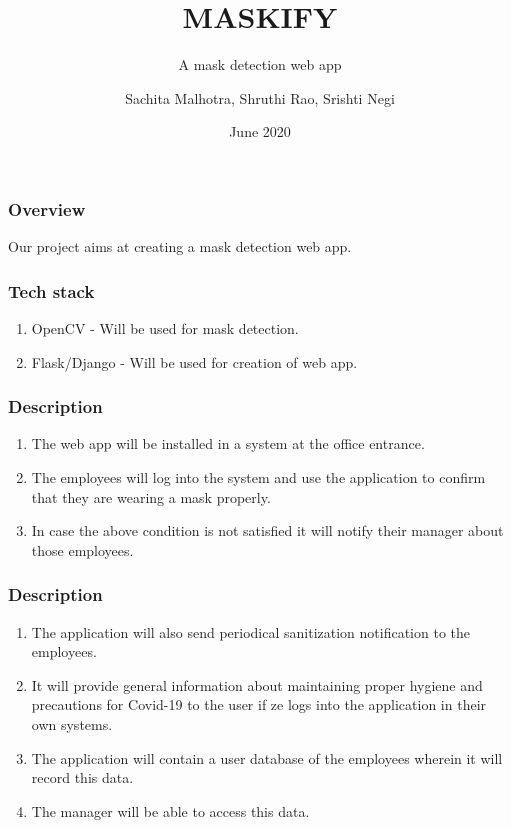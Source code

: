\documentclass[14pt]{beamer}
\title{MASKIFY}
\subtitle{A mask detection web app}
\author[TEAM 6]{Sachita Malhotra, Shruthi Rao, Srishti Negi}
\date{June 2020}
\newcounter{saveenumerate}
\newcommand{\saveenumerate}{\setcounter{saveenumerate}{\value{enumi}}}
\newcommand{\restartenumerate}{\setcounter{enumi}{\value{saveenumerate}}}
\begin{document}
\begin{frame}
    \titlepage
\end{frame}

\begin{frame}
    \frametitle{Overview}
    Our project aims at creating a mask detection web app.
\end{frame}

\begin{frame}
    \frametitle{Tech stack}
    \begin{enumerate}
        \item OpenCV - Will be used for mask detection.
        \item Flask/Django - Will be used for creation of web app.
    \end{enumerate}
\end{frame} 

\begin{frame}
    \frametitle{Description}
    \begin{enumerate}
        \item The web app will be installed in a system at the office entrance.

        \item The employees will log into the system and use the application to confirm that they are wearing a mask properly.

        \item In case the above condition is not satisfied it will notify their manager about those employees.
        \saveenumerate
    \end{enumerate}
\end{frame}

\begin{frame}
    \frametitle{Description}
    \begin{enumerate}
        \restartenumerate
        \item The application will also send periodical sanitization notification to the employees.
            
        \item It will provide general information about maintaining proper hygiene and precautions for Covid-19 to the user if ze logs into the application in their own systems.
        
        \item The application will contain a user database of the employees wherein it will record this data.
        
        \item The manager will be able to access this data.
    \end{enumerate}
\end{frame}
\end{document}
